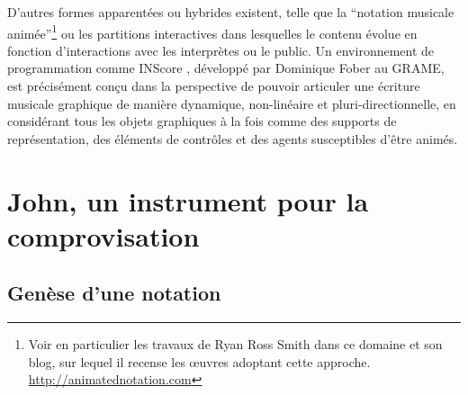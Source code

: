 \indent D'autres formes apparentées ou hybrides existent, telle que la ``notation musicale animée''\footnote{Voir en particulier les travaux de Ryan Ross Smith \cite{smith_atomic_2015} dans ce domaine et son blog, sur lequel il recense les œuvres adoptant cette approche. \url{http://animatednotation.com}} ou les partitions interactives dans lesquelles le contenu évolue en fonction d'interactions avec les interprètes ou le public. Un environnement de programmation comme INScore \cite{fober_inscore-environment_2012}, développé par Dominique Fober au \gls{GRAME}, est précisément conçu dans la perspective de pouvoir articuler une écriture musicale graphique de manière dynamique, non-linéaire et pluri-directionnelle, en considérant tous les objets graphiques à la fois comme des supports de représentation, des éléments de contrôles et des agents susceptibles d'être animés.


\section{John, un instrument pour la comprovisation}

\subsection{Genèse d'une notation}

